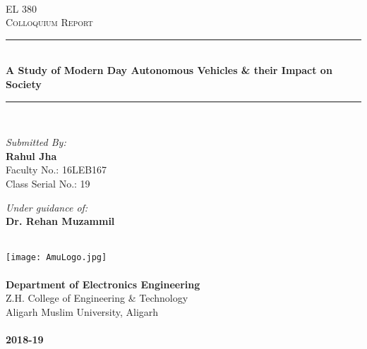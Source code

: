 \begin{titlepage}

\newcommand{\HRule}{\rule{\linewidth}{0.1mm}} 

\thisfancypage{\doublebox}{}
\center
 
\textsc{\Large \\ EL 380}\\[0.5cm]
\textsc{\Large Colloquium Report}\\[0.5cm]

\HRule \\[0.4cm]
{ \huge \bfseries A Study of Modern Day Autonomous Vehicles \& their Impact on
Society}\\[0.1cm]
\HRule \\[0.4cm]
 
\begin{minipage}{0.4\textwidth}
\begin{flushleft} \large

\emph{Submitted By:}\\
\textbf{Rahul Jha}\\
Faculty No.: 16LEB167\\ Class Serial No.: 19
\end{flushleft}

\end{minipage}
\begin{minipage}{0.4\textwidth}
\begin{flushright} \large \emph{Under guidance of:} \\
\textbf{Dr. Rehan Muzammil}
\end{flushright}
\end{minipage}\\[1cm]

\texttt{[image: AmuLogo.jpg]} %
\\~\\
\large{\textbf{Department of Electronics Engineering}\\
    Z.H. College of Engineering \& Technology\\
    Aligarh Muslim University, Aligarh\\~\\
    
    \textbf{2018-19}
}
\vfill
\end{titlepage}
